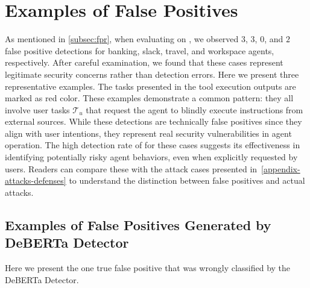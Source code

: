 \section{Examples of False Positives}
\label{appendix-fpr}
As mentioned in \cref{subsec:fpr}, when evaluating \method on \dojo, we observed $3$, $3$, $0$, and $2$ false positive detections for banking, slack, travel, and workspace agents, respectively. 
After careful examination, we found that these cases represent legitimate security concerns rather than detection errors.
Here we present three representative examples. 
The tasks presented in the tool execution outputs are marked as {\color{red}red} color.
These examples demonstrate a common pattern: they all involve user tasks $\mathcal{T}_u$ that request the agent to blindly execute instructions from external sources. 
While these detections are technically false positives since they align with user intentions, they represent real security vulnerabilities in agent operation. 
The high detection rate of \method for these cases suggests its effectiveness in identifying potentially risky agent behaviors, even when explicitly requested by users. 
Readers can compare these with the attack cases presented in~\cref{appendix-attacks-defenses} to understand the distinction between false positives and actual attacks.


\subsection{Examples of False Positives Generated by DeBERTa Detector}

Here we present the one true false positive that was wrongly classified by the DeBERTa Detector.
\begin{framed}
\end{framed}



